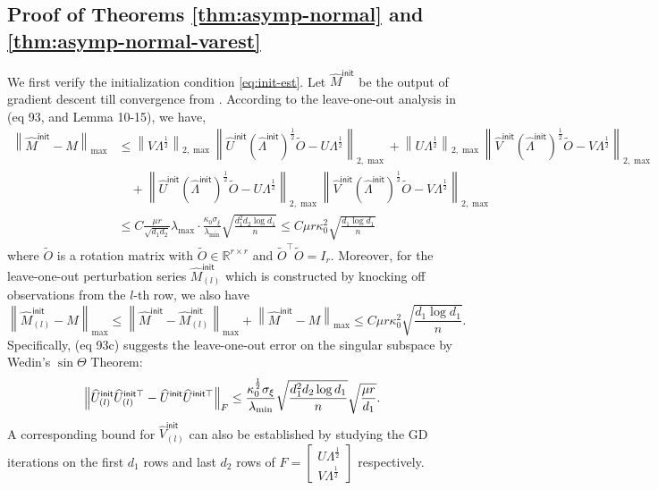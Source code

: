 \documentclass[12pt]{article}
\newcommand{\tF}{{\rm F}}
\newcommand{\norm}[1]{\left\lVert#1\right\rVert}
\newcommand{\R}{\mathbb{R}}
\newcommand{\init}{{\mathsf{init}}}
\theoremstyle{plain}
\begin{document}
\subsection{Proof of Theorems \ref{thm:asymp-normal} and \ref{thm:asymp-normal-varest}}\label{sec:proof-clt}
We first verify the initialization condition \eqref{eq:init-est}. Let $\widehat{M}^{\init}$ be the output of gradient descent till convergence from \cite{chen2020noisy}. According to the leave-one-out analysis in \cite{chen2020noisy} (eq 93, and Lemma 10-15), we have, 
\begin{equation}\label{eq:lol-init-1}
  \begin{aligned}
        \norm{\widehat{M}^{\init}- M}_{\max} & \le \norm{V\Lambda^{\frac{1}{2}}}_{2,\max}\norm{\widehat{U}^{\init}(\widehat{\Lambda}^{\init})^{\frac{1}{2}}\widetilde{O}  - U\Lambda^{\frac{1}{2}} }_{2,\max} + \norm{U\Lambda^{\frac{1}{2}}}_{2,\max}\norm{\widehat{V}^{\init}(\widehat{\Lambda}^{\init})^{\frac{1}{2}}\widetilde{O}  - V\Lambda^{\frac{1}{2}} }_{2,\max} 
        \\
        &\quad + \norm{\widehat{U}^{\init}(\widehat{\Lambda}^{\init})^{\frac{1}{2}}\widetilde{O}  - U\Lambda^{\frac{1}{2}} }_{2,\max} \norm{\widehat{V}^{\init}(\widehat{\Lambda}^{\init})^{\frac{1}{2}}\widetilde{O}  - V\Lambda^{\frac{1}{2}} }_{2,\max} 
        \\
        & \le C \frac{\mu r}{\sqrt{d_1 d_2}}\lambda_{\max}\cdot \frac{\kappa_0\sigma_{\xi}}{\lambda_{\min }} \sqrt{\frac{d_1^2 d_2 \log d_1}{n }} 
        \le C \mu r\kappa_0^2 \sqrt{\frac{d_1\log d_1}{n }} 
  \end{aligned}
\end{equation}
where $\widetilde{O}$ is a rotation matrix with $\widetilde{O}\in\R^{r\times r}$ and $\widetilde{O}^\top \widetilde{O}=I_{r}$. Moreover, for the leave-one-out perturbation series $\widehat{M}^{\init}_{(l)}$ which is constructed by knocking off observations from the $l$-th row, we also have
\begin{equation}\label{eq:lol-init-2}
     \norm{\widehat{M}^{\init}_{(l)}- M}_{\max} \le  \norm{\widehat{M}^{\init}- \widehat{M}^{\init}_{(l)}}_{\max} + \norm{\widehat{M}^{\init}- M}_{\max} \le C \mu r\kappa_0^2 \sqrt{\frac{d_1\log d_1}{n }}.
\end{equation}
Specifically, \cite{chen2020noisy} (eq 93c) suggests the leave-one-out error on the singular subspace by Wedin's $\sin\Theta$ Theorem:
\begin{equation}\label{eq:lol-init-3}
    \norm{\widehat{U}^{\init}_{(l)} \widehat{U}^{\init\top}_{(l)}-\widehat{U}^{\init} \widehat{U}^{\init\top}}_{\tF}\le \frac{\kappa_0^{\frac{1}{2}}\sigma_{\xi}}{\lambda_{\min }} \sqrt{\frac{d_1^2 d_2 \log d_1}{n }} \sqrt{\frac{\mu r}{d_1}}.
\end{equation}
A corresponding bound for $\widehat{V}^{\init}_{(l)}$ can also be established by studying the GD iterations on the first $d_1$ rows and last $d_2$ rows of $F=\left[\begin{array}{c}
         U\Lambda^{\frac{1}{2}}  \\
          V \Lambda^{\frac{1}{2}}
    \end{array}\right]$ respectively. 
    
\end{document}
